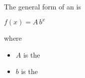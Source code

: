 The general form of an   is 
\begin{tcolorbox}[center,width=4in,colback=white,]
    \begin{center}
        \large
        $f(x) = A \, b^x$
    \end{center}
    where
    \begin{itemize}[nosep]
        \item $A$ is the   
        \item $b$ is the  
    \end{itemize}
\end{tcolorbox}
